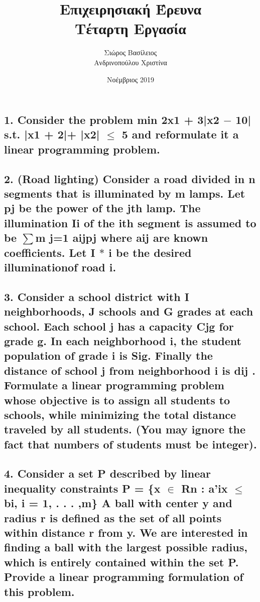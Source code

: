 \documentclass[12pt]{article}
\title{\hugeΑλγοριθμική Επιχειρησιακή Έρευνα\\Τέταρτη Εργασία}
\author{Σιώρος Βασίλειος\\Ανδρινοπούλου Χριστίνα}
\date{Νοέμβριος 2019}
\begin{document}
\maketitle


\pagebreak


\subsection*{1. Consider the problem
min 2x1 + 3|x2 \ensuremath{-} 10|
s.t. |x1 + 2|+ |x2| \ensuremath{\leq} 5
and reformulate it a linear programming problem.}

\vspace{2in}

\pagebreak

\subsection*{2. (Road lighting) Consider a road divided in n segments that is illuminated by m
lamps. Let pj be the power of the jth lamp. The illumination Ii of the ith segment is assumed
to be
\ensuremath{\sum}m
j=1 aijpj where aij are known coefficients. Let I
\ensuremath{*}
i be the desired illuminationof road i.}

\vspace{2in}

\pagebreak

\subsection*{3. Consider a school district with I neighborhoods, J schools and G grades
at each school. Each school j has a capacity Cjg for grade g. In each neighborhood i, the
student population of grade i is Sig. Finally the distance of school j from neighborhood i is dij .
Formulate a linear programming problem whose objective is to assign all students to schools,
while minimizing the total distance traveled by all students. (You may ignore the fact that
numbers of students must be integer).}

\vspace{2in}

\pagebreak

\subsection*{4. Consider a set P described by linear inequality constraints
P = \{x \ensuremath{\in} Rn : a'ix \ensuremath{\leq} bi, i = 1, . . . ,m\}
A ball with center y and radius r is defined as the set of all points within distance r from y.
We are interested in finding a ball with the largest possible radius, which is entirely contained
within the set P. Provide a linear programming formulation of this problem.}

\vspace{2in}

\pagebreak
\end{document}
